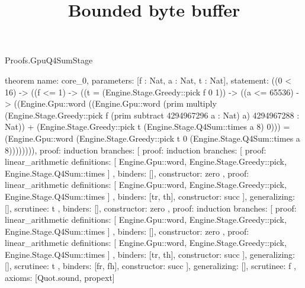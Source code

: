 \begin{lexlean}{Proofs.GpuQ4SumStage}
\title{Bounded byte buffer}
\begin{semanticmodule}
theorem{
  name: core_0,
  parameters: [f : Nat, a : Nat, t : Nat],
  statement: ((0 < 16) -> ((f <= 1) -> ((t = (Engine.Stage.Greedy::pick f 0 1)) -> ((a <= 65536) -> ((Engine.Gpu::word ((Engine.Gpu::word (prim multiply (Engine.Stage.Greedy::pick f (prim subtract 4294967296 a : Nat) a) 4294967288 : Nat)) + (Engine.Stage.Greedy::pick t (Engine.Stage.Q4Sum::times a 8) 0))) = (Engine.Gpu::word (Engine.Stage.Greedy::pick t 0 (Engine.Stage.Q4Sum::times a 8)))))))),
  proof: induction{
    branches: [
      {
        proof: induction{
          branches: [
            {
              proof: linear_arithmetic{
                definitions: [
                  Engine.Gpu::word,
                  Engine.Stage.Greedy::pick,
                  Engine.Stage.Q4Sum::times
                ]
              },
              binders: [],
              constructor: zero
            },
            {
              proof: linear_arithmetic{
                definitions: [
                  Engine.Gpu::word,
                  Engine.Stage.Greedy::pick,
                  Engine.Stage.Q4Sum::times
                ]
              },
              binders: [tr, th],
              constructor: succ
            }
          ],
          generalizing: [],
          scrutinee: t
        },
        binders: [],
        constructor: zero
      },
      {
        proof: induction{
          branches: [
            {
              proof: linear_arithmetic{
                definitions: [
                  Engine.Gpu::word,
                  Engine.Stage.Greedy::pick,
                  Engine.Stage.Q4Sum::times
                ]
              },
              binders: [],
              constructor: zero
            },
            {
              proof: linear_arithmetic{
                definitions: [
                  Engine.Gpu::word,
                  Engine.Stage.Greedy::pick,
                  Engine.Stage.Q4Sum::times
                ]
              },
              binders: [tr, th],
              constructor: succ
            }
          ],
          generalizing: [],
          scrutinee: t
        },
        binders: [fr, fh],
        constructor: succ
      }
    ],
    generalizing: [],
    scrutinee: f
  },
  axioms: [Quot.sound, propext]
}


\end{semanticmodule}
\end{lexlean}

